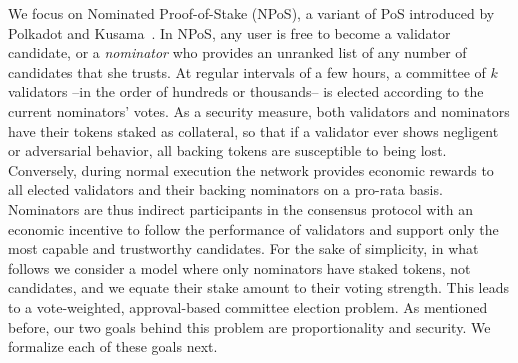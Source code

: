 We focus on Nominated Proof-of-Stake (NPoS), a variant of PoS introduced by Polkadot and Kusama~\cite{burdges2020overview}. In NPoS, any user is free to become a validator candidate, or a \emph{nominator} who provides an unranked list of any number of candidates that she trusts. At regular intervals of a few hours, a committee of $k$ validators --in the order of hundreds or thousands-- is elected according to the current nominators' votes. As a security measure, both validators and nominators have their tokens staked as collateral, so that if a validator ever shows negligent or adversarial behavior, all backing tokens are susceptible to being lost. Conversely, during normal execution the network provides economic rewards to all elected validators and their backing nominators on a pro-rata basis. Nominators are thus indirect participants in the consensus protocol with an economic incentive to follow the performance of validators and support only the most capable and trustworthy candidates. For the sake of simplicity, in what follows we consider a model where only nominators have staked tokens, not candidates, and we equate their stake amount to their voting strength. This leads to a vote-weighted, approval-based committee election problem. As mentioned before, our two goals behind this problem are proportionality and security. We formalize each of these goals next. 

